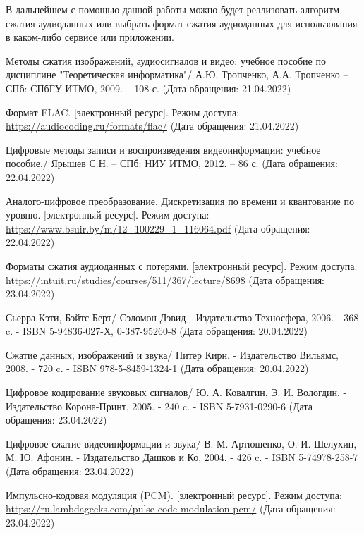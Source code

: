 \documentclass[12pt,a4paper,oneside]{report}
\begin{document}
В дальнейшем с помощью данной работы можно будет реализовать алгоритм сжатия аудиоданных или выбрать формат сжатия аудиоданных для использования в каком-либо сервисе или приложении.
\clearpage
{}
\renewcommand{\bibname}{Список использованной литературы}
\begin{thebibliography}{2}
	 Методы сжатия изображений, аудиосигналов и видео: учебное пособие по дисциплине "Теоретическая информатика"/ А.Ю. Тропченко, А.А. Тропченко – СПб: СПбГУ ИТМО, 2009. – 108 с. (Дата обращения: 21.04.2022)
	
	 Формат FLAC.  [электронный ресурс]. Режим доступа:
	\url{https://audiocoding.ru/formats/flac/}
	(Дата обращения: 21.04.2022)
	
	 Цифровые методы записи и воспроизведения
	видеоинформации: учебное пособие./ Ярышев С.Н. –  СПб: НИУ ИТМО, 2012. – 86 с. (Дата обращения: 22.04.2022)
	
	Аналого-цифровое преобразование. Дискретизация по времени и квантование по уровню.  [электронный ресурс]. Режим доступа:
	\url{https://www.bsuir.by/m/12_100229_1_116064.pdf}
	(Дата обращения: 22.04.2022)
	
	Форматы сжатия аудиоданных с потерями.   [электронный ресурс]. Режим доступа:
	\url{https://intuit.ru/studies/courses/511/367/lecture/8698}
	(Дата обращения: 23.04.2022)
	
	Сьерра Кэти, Бэйтс Берт/ Сэломон Дэвид - Издательство Техносфера, 2006. - 368 c. - ISBN 5-94836-027-Х, 0-387-95260-8
	(Дата обращения: 20.04.2022)
	
	Сжатие данных, изображений и звука/ Питер Кирн. - Издательство Вильямс, 2008. - 720 c. - ISBN 978-5-8459-1324-1  
	(Дата обращения: 20.04.2022)
	
	Цифровое кодирование звуковых сигналов/ Ю. А. Ковалгин, Э. И. Вологдин. - Издательство Корона-Принт, 2005. - 240 c. - ISBN 5-7931-0290-6  
	(Дата обращения: 23.04.2022)
	
	Цифровое сжатие видеоинформации и звука/ 
	В. М. Артюшенко, О. И. Шелухин, М. Ю. Афонин. - Издательство 
	Дашков и Ко, 2004. - 426 c. - ISBN 5-74978-258-7
	(Дата обращения: 23.04.2022)
	
	Импульсно-кодовая модуляция (PCM). [электронный ресурс]. Режим доступа: 
	\url{https://ru.lambdageeks.com/pulse-code-modulation-pcm/}
	(Дата обращения: 23.04.2022)


\end{thebibliography}
\end{document}
